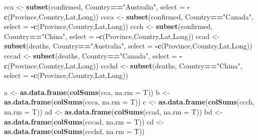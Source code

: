 \documentclass[
]{article}
\newenvironment{Shaded}{\begin{snugshade}}{\end{snugshade}}
\newcommand{\DataTypeTok}[1]{\textcolor[rgb]{0.13,0.29,0.53}{#1}}
\newcommand{\KeywordTok}[1]{\textcolor[rgb]{0.13,0.29,0.53}{\textbf{#1}}}
\newcommand{\NormalTok}[1]{#1}
\newcommand{\OperatorTok}[1]{\textcolor[rgb]{0.81,0.36,0.00}{\textbf{#1}}}
\newcommand{\StringTok}[1]{\textcolor[rgb]{0.31,0.60,0.02}{#1}}
\begin{document}
\begin{Shaded}
\begin{Highlighting}[]
\NormalTok{cca <-}\StringTok{ }\KeywordTok{subset}\NormalTok{(confirmed, Country}\OperatorTok{==}\StringTok{"Australia"}\NormalTok{, }\DataTypeTok{select =} \OperatorTok{-}\KeywordTok{c}\NormalTok{(Province,Country,Lat,Long))}
\NormalTok{ccca <-}\StringTok{ }\KeywordTok{subset}\NormalTok{(confirmed, Country}\OperatorTok{==}\StringTok{"Canada"}\NormalTok{, }\DataTypeTok{select =} \OperatorTok{-}\KeywordTok{c}\NormalTok{(Province,Country,Lat,Long))}
\NormalTok{ccch <-}\StringTok{ }\KeywordTok{subset}\NormalTok{(confirmed, Country}\OperatorTok{==}\StringTok{"China"}\NormalTok{, }\DataTypeTok{select =} \OperatorTok{-}\KeywordTok{c}\NormalTok{(Province,Country,Lat,Long))}
\NormalTok{ccad <-}\StringTok{ }\KeywordTok{subset}\NormalTok{(deaths, Country}\OperatorTok{==}\StringTok{"Australia"}\NormalTok{, }\DataTypeTok{select =} \OperatorTok{-}\KeywordTok{c}\NormalTok{(Province,Country,Lat,Long))}
\NormalTok{cccad <-}\StringTok{ }\KeywordTok{subset}\NormalTok{(deaths, Country}\OperatorTok{==}\StringTok{"Canada"}\NormalTok{, }\DataTypeTok{select =} \OperatorTok{-}\KeywordTok{c}\NormalTok{(Province,Country,Lat,Long))}
\NormalTok{ccchd <-}\StringTok{ }\KeywordTok{subset}\NormalTok{(deaths, Country}\OperatorTok{==}\StringTok{"China"}\NormalTok{, }\DataTypeTok{select =} \OperatorTok{-}\KeywordTok{c}\NormalTok{(Province,Country,Lat,Long))}


\NormalTok{a <-}\StringTok{ }\KeywordTok{as.data.frame}\NormalTok{(}\KeywordTok{colSums}\NormalTok{(cca, }\DataTypeTok{na.rm =}\NormalTok{ T))}
\NormalTok{b <-}\StringTok{ }\KeywordTok{as.data.frame}\NormalTok{(}\KeywordTok{colSums}\NormalTok{(ccca, }\DataTypeTok{na.rm =}\NormalTok{ T))}
\NormalTok{c <-}\StringTok{ }\KeywordTok{as.data.frame}\NormalTok{(}\KeywordTok{colSums}\NormalTok{(ccch, }\DataTypeTok{na.rm =}\NormalTok{ T))}
\NormalTok{ad <-}\StringTok{ }\KeywordTok{as.data.frame}\NormalTok{(}\KeywordTok{colSums}\NormalTok{(ccad, }\DataTypeTok{na.rm =}\NormalTok{ T))}
\NormalTok{bd <-}\StringTok{ }\KeywordTok{as.data.frame}\NormalTok{(}\KeywordTok{colSums}\NormalTok{(cccad, }\DataTypeTok{na.rm =}\NormalTok{ T))}
\NormalTok{cd <-}\StringTok{ }\KeywordTok{as.data.frame}\NormalTok{(}\KeywordTok{colSums}\NormalTok{(ccchd, }\DataTypeTok{na.rm =}\NormalTok{ T))}


\end{Highlighting}
\end{Shaded}
\end{document}
